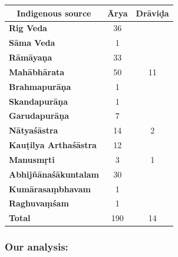 \begin{table}[!htbp]
\caption{204 occurences of \textit{Ārya} and \textit{Drāviḍa}\\ from 13 different sources}\label{art3-tab1}
\begin{longtable}{@{}|l|c|c|@{}}
\hline
\multicolumn{1}{|c|}{\textbf{Indigenous source}} & \multicolumn{1}{c|}{\textbf{Ārya}} & \multicolumn{1}{c|}{\textbf{Drāviḍa}} \\
\hline
\textbf{Rig Veda} & 36 &  \\
\hline
\textbf{Sāma Veda} & 1 &  \\
\hline
\textbf{Rāmāyaṇa} & 33 &  \\
\hline
\textbf{Mahābhārata} & 50 & 11 \\
\hline
\textbf{Brahmapurāṇa} & 1 &  \\
\hline
\textbf{Skandapurāṇa} & 1 &  \\
\hline
\textbf{Garudapurāṇa} & 7 &  \\
\hline
\textbf{Nātyaśāstra} & 14 & 2 \\
\hline
\textbf{Kauṭilya Arthaśāstra} & 12 &  \\
\hline
\textbf{Manusmṛti} & 3 & 1 \\
\hline
\textbf{Abhijñānaśākuntalam} & 30 &  \\
\hline
\textbf{Kumārasaṃbhavam} & 1 &  \\
\hline
\textbf{Raghuvaṃśam} & 1 &  \\
\hline
\textbf{Total} & 190 & 14 \\
\hline
\end{longtable}
\end{table}


\subsubsection{Our analysis:}

